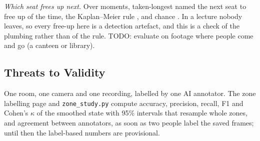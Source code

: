 \emph{Which seat frees up next.} Over  moments, taken-longest
named the next seat to free up  of the time, the
Kaplan--Meier rule , and chance
. In a lecture nobody leaves, so every free-up here is a
detection artefact, and this is a check of the plumbing rather than of the rule.
TODO: evaluate on footage where people come and go (a canteen or library).

\subsection{Threats to Validity}
One room, one camera and one recording, labelled by one AI annotator. The zone
labelling page and \texttt{zone\_study.py} compute accuracy, precision, recall,
F1 and Cohen's $\kappa$ of the smoothed state with 95\% intervals that resample
whole zones, and agreement between annotators, as soon as two people label the
saved frames; until then the label-based numbers are provisional.
